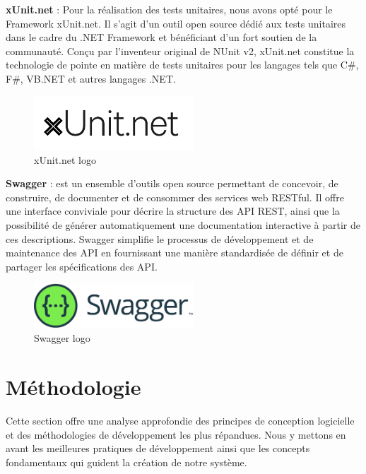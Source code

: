 \textbf{xUnit.net} : Pour la réalisation des tests unitaires, nous avons opté pour le Framework xUnit.net. Il s'agit d'un outil open source dédié aux tests unitaires dans le cadre du .NET Framework et bénéficiant d'un fort soutien de la communauté. Conçu par l'inventeur original de NUnit v2, xUnit.net constitue la technologie de pointe en matière de tests unitaires pour les langages tels que C\#, F\#, VB.NET et autres langages .NET.
\\
\begin{figure}[H]
    \centering
    \includegraphics[width=6cm]{Figures/xunitlogo.png}
    \caption{xUnit.net logo}
\end{figure}


\textbf{Swagger} : est un ensemble d'outils open source permettant de concevoir, de construire, de documenter et de consommer des services web RESTful. Il offre une interface conviviale pour décrire la structure des API REST, ainsi que la possibilité de générer automatiquement une documentation interactive à partir de ces descriptions. Swagger simplifie le processus de développement et de maintenance des API en fournissant une manière standardisée de définir et de partager les spécifications des API.
\\
\begin{figure}[H]
    \centering
    \includegraphics[width=6cm]{Figures/swaggerlogo.png}
    \caption{Swagger logo}
\end{figure}






\section{Méthodologie}

Cette section offre une analyse approfondie des principes de conception logicielle et des méthodologies de développement les plus répandues. Nous y mettons en avant les meilleures pratiques de développement ainsi que les concepts fondamentaux qui guident la création de notre système.


